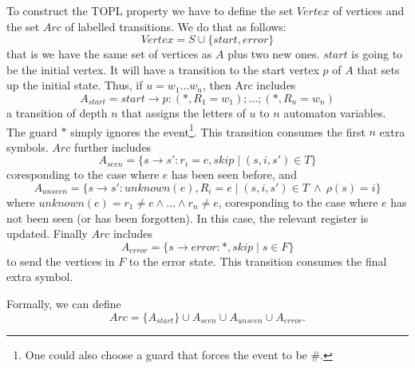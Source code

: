 \newcommand{\Vertex}{\mathit{Vertex}}
\newcommand{\Arc}{\mathit{Arc}}
To construct the TOPL property we have to define the set $\Vertex$
of vertices and the set $\Arc$ of labelled transitions. We do that as follows:
\[
\Vertex = S \cup \{start, error\}
\]
that is we have the same set of vertices as $A$ plus two new
ones. $start$ is going to be the initial vertex. It will have a
transition to the start vertex $p$ of $A$ that sets up the
initial state. Thus, if $u = w_1\ldots w_n$, then Arc includes
\[
A_{start} = start \to p: (*,R_1=w_1);\ldots;(*,R_n=w_n)
\]
a transition of depth $n$ that assigns the letters of $u$
to $n$ automaton variables. The guard $*$ simply ignores the
event\footnote{One could also choose a guard that forces the event
to be \#.}. This transition consumes the first $n$ extra
symbols. $\Arc$ further includes
\[
A_{seen} = \{s\to s': r_i=e, skip \mid (s, i, s') \in T \}
\]
coresponding to the case where $e$ has been seen before, and
\[
A_{unseen} = \{s\to s': unknown(e), R_i=e \mid (s, i, s') \in T\ \land\ \rho(s)=i \}
\]
where $unknown(e) = r_1 \neq e \land \ldots \land r_n \neq e$,
coresponding to the case where $e$ has not been seen (or has been
forgotten). In this case, the relevant register is
updated. Finally $\Arc$ includes
\[
A_{error} = \{s\to error: *, skip \mid s\in F \}
\]
to send the vertices in $F$ to the error state. This transition
consumes the final extra symbol.

Formally, we can define
\[
\Arc = \{A_{start}\} \cup A_{seen} \cup A_{unseen} \cup A_{error}.
\]
